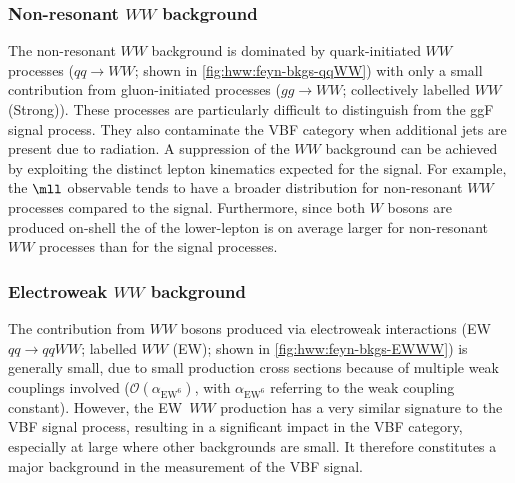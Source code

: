 \subsubsection{Non-resonant $WW$ background}
The non-resonant $WW$ background is dominated by quark-initiated $WW$ processes ($qq \to WW$; shown in \cref{fig:hww:feyn-bkgs-qqWW}) with only a small contribution from gluon-initiated processes ($gg \to WW$; collectively labelled $WW$ (Strong)).
These processes are particularly difficult to distinguish from the ggF signal process.
They also contaminate the VBF \TwoJet category when additional jets are present due to radiation. 
A suppression of the $WW$ background can be achieved by exploiting the distinct lepton kinematics expected for the signal. For example, the $\mll$ observable tends to have a broader distribution for non-resonant $WW$ processes compared to the signal. 
Furthermore, since both $W$ bosons are produced on-shell the \pT of the lower-\pT lepton is on average larger for non-resonant $WW$ processes than for the signal processes. 

\subsubsection{Electroweak $WW$ background}
The contribution from $WW$ bosons produced via electroweak interactions (EW $qq \to qqWW$; labelled $WW$ (EW); shown in \cref{fig:hww:feyn-bkgs-EWWW}) is generally small, due to small production cross sections because of multiple weak couplings involved ($\mathcal{O}(\alpha_{\text{EW}^6})$, with $\alpha_{\text{EW}^6}$ referring to the weak coupling constant). However, the EW~$WW$ production has a very similar signature to the VBF signal process, resulting in a significant impact in the VBF category, especially at large \mjj where other backgrounds are small. 
It therefore constitutes a major background in the measurement of the VBF signal. 

